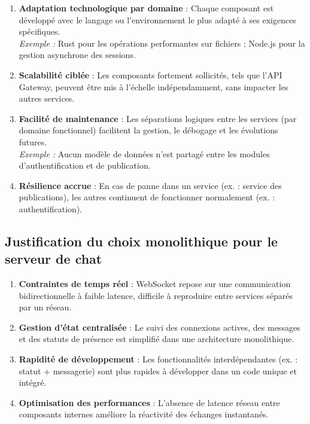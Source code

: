 \documentclass[12pt]{rapportPfe}
\begin{document}
\begin{enumerate}
    \item \textbf{Adaptation technologique par domaine} : Chaque composant est développé avec le langage ou l’environnement le plus adapté à ses exigences spécifiques. \\
    \textit{Exemple :} Rust pour les opérations performantes sur fichiers ; Node.js pour la gestion asynchrone des sessions.
    
    \item \textbf{Scalabilité ciblée} : Les composants fortement sollicités, tels que l’API Gateway, peuvent être mis à l’échelle indépendamment, sans impacter les autres services.
    
    \item \textbf{Facilité de maintenance} : Les séparations logiques entre les services (par domaine fonctionnel) facilitent la gestion, le débogage et les évolutions futures.\\
    \textit{Exemple :} Aucun modèle de données n’est partagé entre les modules d’authentification et de publication.
    
    \item \textbf{Résilience accrue} : En cas de panne dans un service (ex. : service des publications), les autres continuent de fonctionner normalement (ex. : authentification).
\end{enumerate}

\subsection{Justification du choix monolithique pour le serveur de chat}

\begin{enumerate}
    \item \textbf{Contraintes de temps réel} : WebSocket repose sur une communication bidirectionnelle à faible latence, difficile à reproduire entre services séparés par un réseau.
    
    \item \textbf{Gestion d’état centralisée} : Le suivi des connexions actives, des messages et des statuts de présence est simplifié dans une architecture monolithique.
    
    \item \textbf{Rapidité de développement} : Les fonctionnalités interdépendantes (ex. : statut + messagerie) sont plus rapides à développer dans un code unique et intégré.
    
    \item \textbf{Optimisation des performances} : L’absence de latence réseau entre composants internes améliore la réactivité des échanges instantanés.
\end{enumerate}
\end{document}
